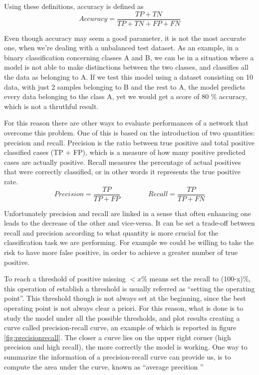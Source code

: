 \documentclass[11pt]{report}
\begin{document}
Using these definitions, accuracy is defined as
\begin{equation}
Accuracy = \frac{TP + TN}{TP+TN+FP+FN}
\end{equation}

Even though accuracy may seem a good parameter, it is not the most accurate one, when we're dealing with a unbalanced test dataset.
As an example, in a binary classification concerning classes A and B, we can be in a situation where a model is not able to make distinctions between the two classes, and classifies all the data as belonging to A.
If we test this model using a dataset consisting on 10 data, with just 2 samples belonging to B and the rest to A, the model predicts every data belonging to the class A, yet we would get a score of 80 \% accuracy, which is not a thruthful result.

For this reason there are other ways to evaluate performances of a network that overcome this problem.
One of this is based on the introduction of two quantities: precision and recall.
Precision is the ratio between true positive and total positive classified cases (TP + FP), which is a measure of how many positive predicted cases are actually positive.
Recall measures the percentage of actual positives that were correctly classified, or in other words it represents the true positive rate.
\begin{equation}
Precision = \frac{TP}{TP+FP} \qquad \qquad Recall = \frac{TP}{TP+FN}
\end{equation}

Unfortunately precision and recall are linked in a sense that often enhancing one leads to the decrease of the other and vice-versa.
It can be set a trade-off between recall and precision according to what quantity is more crucial for the classification task we are performing.
For example we could be willing to take the risk to have more false positive, in order to achieve a greater number of true positive.

To reach a threshold of positive missing $<x\%$ means set the recall to (100-x)\%, this operation of establish a threshold is usually referred as \textquotedblleft setting the operating point\textquotedblright.
This threshold though is not always set at the beginning, since the best operating point is not always clear a priori.
For this reason, what is done is to study the model under all the possible thresholds, and plot results creating a curve called precision-recall curve, an example of which is reported in figure \ref{fig:precisionrecall}.
The closer a curve lies on the upper right corner (high precision and high recall), the more correctly the model is working.
One way to summarize the information of a precision-recall curve can provide us, is to compute the area under the curve, known as \textquotedblleft average precition \textquotedblright
\end{document}
